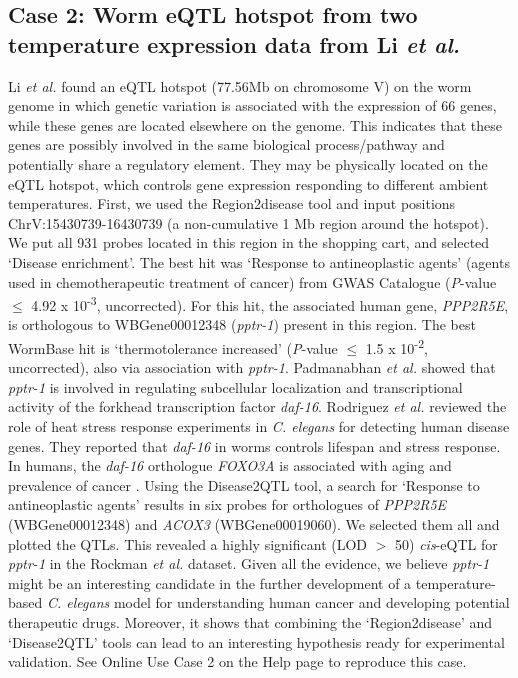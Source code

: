 \subsection[Case 2: Li \textsl{et al.}]{Case 2: Worm eQTL hotspot from two temperature expression data from Li \textsl{et al.} \cite{Li_2006}}
Li \textsl{et al.} \cite{Li_2006} found an eQTL hotspot (77.56Mb on chromosome V) on the worm genome in which genetic variation is associated with the expression of 66 genes, while these genes are located elsewhere on the genome.
This indicates that these genes are possibly involved in the same biological process/pathway and potentially share a regulatory element.
They may be physically located on the eQTL hotspot, which controls gene expression responding to different ambient temperatures.
First, we used the Region2disease tool and input positions ChrV:15430739-16430739 (a non-cumulative 1 Mb region around the hotspot).
We put all 931 probes located in this region in the shopping cart, and selected ‘Disease enrichment’.
The best hit was ‘Response to antineoplastic agents’ (agents used in chemotherapeutic treatment of cancer) from GWAS Catalogue (\textsl{P}-value $\leq$ 4.92 x 10\textsuperscript{-3}, uncorrected).
For this hit, the associated human gene, \textsl{PPP2R5E}, is orthologous to WBGene00012348 (\textsl{pptr-1}) present in this region. The best WormBase hit is ‘thermotolerance increased’ (\textsl{P}-value $\leq$ 1.5 x 10\textsuperscript{-2}, uncorrected), also via association with \textsl{pptr-1}.
Padmanabhan \textsl{et al.} \cite{Padmanabhan_2009} showed that \textsl{pptr-1} is involved in regulating subcellular localization and transcriptional activity of the forkhead transcription factor \textsl{daf-16}.
Rodriguez \textsl{et al.} \cite{Rodriguez_2013} reviewed the role of heat stress response experiments in \textsl{C. elegans} for detecting human disease genes.
They reported that \textsl{daf-16} in worms controls lifespan and stress response.
In humans, the \textsl{daf-16} orthologue \textsl{FOXO3A} is associated with aging and prevalence of cancer \cite{Willcox_2008}.
Using the Disease2QTL tool, a search for ‘Response to antineoplastic agents’ results in six probes for orthologues of \textsl{PPP2R5E} (WBGene00012348) and \textsl{ACOX3} (WBGene00019060).
We selected them all and plotted the QTLs.
This revealed a highly significant (LOD $>$ 50) \textsl{cis}-eQTL for \textsl{pptr-1} in the Rockman \textsl{et al.} \cite{Rockman_2010} dataset.
Given all the evidence, we believe \textsl{pptr-1} might be an interesting candidate in the further development of a temperature-based \textsl{C. elegans} model for understanding human cancer and developing potential therapeutic drugs.
Moreover, it shows that combining the ‘Region2disease’ and ‘Disease2QTL’ tools can lead to an interesting hypothesis ready for experimental validation.
See Online Use Case 2 on the Help page to reproduce this case.

